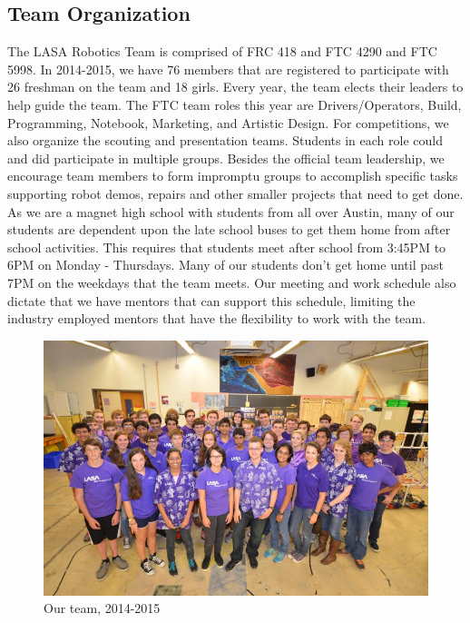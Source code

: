 \subsection{Team Organization}
The LASA Robotics Team is comprised of FRC 418 and FTC 4290 and FTC 5998.  In 2014-2015, we have 76 members that are registered to participate with 26 freshman on the team and 18 girls.  Every year, the team elects their leaders to help guide the team.  The FTC team roles this year are Drivers/Operators, Build, Programming, Notebook, Marketing, and Artistic Design.  For competitions, we also organize the scouting and presentation teams.  Students in each role could and did participate in multiple groups.  Besides the official team leadership, we encourage team members to form impromptu groups to accomplish specific tasks supporting robot demos, repairs and other smaller projects that need to get done.\\

As we are a magnet high school with students from all over Austin, many of our students are dependent upon the late school buses to get them home from after school activities.  This requires that students meet after school from 3:45PM to 6PM on Monday - Thursdays.  Many of our students don’t get home until past 7PM on the weekdays that the team meets.  Our meeting and work schedule also dictate that we have mentors that can support this schedule, limiting the industry employed mentors that have the flexibility to work with the team.\\

\begin{figure}[H]
	\centering
	\includegraphics[width=\linewidth]{teamorg}
	\caption[]{Our team, 2014-2015}
	\label{fig:team}
\end{figure}

